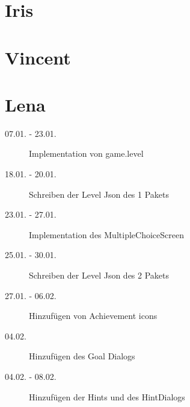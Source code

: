 \section{Iris}

\section{Vincent}

\section{Lena}
\begin{description}
\item[07.01. - 23.01.]
Implementation von game.level
\item[18.01. - 20.01.]
Schreiben der Level Json des 1 Pakets
\item[23.01. - 27.01.]
Implementation des MultipleChoiceScreen
\item[25.01. - 30.01.]
Schreiben der Level Json des 2 Pakets
\item[27.01. - 06.02.]
Hinzufügen von Achievement icons
\item[04.02.]
Hinzufügen des Goal Dialogs
\item[04.02. - 08.02.]
Hinzufügen der Hints und des HintDialogs
\end{description}
